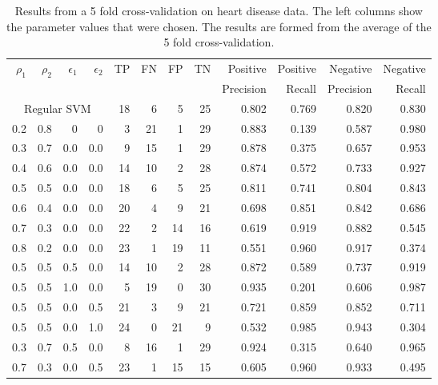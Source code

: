           

\begin{table}[htbp]\label{table:HeartDisease1}
  \centering
    \begin{tabular}{rrrr|rrrrrrrr}
    \hline
    \multirow{2}{*}{$\rho_1$} & \multirow{2}{*}{$\rho_2$} & \multirow{2}{*}{$\epsilon_1$} & \multirow{2}{*}{$\epsilon_2$} & \multirow{2}{*}{TP}    & \multirow{2}{*}{FN}    & \multirow{2}{*}{FP}    & \multirow{2}{*}{TN} & Positive & Positive & Negative & Negative\\
    &&&&&&&&  Precision &  Recall &  Precision &  Recall \bigstrut\\
    \hline
    \hline
   \multicolumn{4}{c|}{Regular SVM} & 18    & 6     & 5     & 25    & 0.802 & 0.769 & 0.820 & 0.830 \bigstrut[t]\\
    0.2   & 0.8   & 0     & 0     & 3     & 21    & 1     & 29    & 0.883 & 0.139 & 0.587 & 0.980 \bigstrut[t]\\
    0.3   & 0.7   & 0.0   & 0.0   & 9     & 15    & 1     & 29    & 0.878 & 0.375 & 0.657 & 0.953 \\
    0.4   & 0.6   & 0.0   & 0.0   & 14    & 10    & 2     & 28    & 0.874 & 0.572 & 0.733 & 0.927 \\
    0.5   & 0.5   & 0.0   & 0.0   & 18    & 6     & 5     & 25    & 0.811 & 0.741 & 0.804 & 0.843 \\
    0.6   & 0.4   & 0.0   & 0.0   & 20    & 4     & 9     & 21    & 0.698 & 0.851 & 0.842 & 0.686 \\
    0.7   & 0.3   & 0.0   & 0.0   & 22    & 2     & 14    & 16    & 0.619 & 0.919 & 0.882 & 0.545 \\
    0.8   & 0.2   & 0.0   & 0.0   & 23    & 1     & 19    & 11    & 0.551 & 0.960 & 0.917 & 0.374 \\
    0.5   & 0.5   & 0.5   & 0.0   & 14    & 10    & 2     & 28    & 0.872 & 0.589 & 0.737 & 0.919 \\
    0.5   & 0.5   & 1.0   & 0.0   & 5     & 19    & 0     & 30    & 0.935 & 0.201 & 0.606 & 0.987 \\
    0.5   & 0.5   & 0.0   & 0.5   & 21    & 3     & 9     & 21    & 0.721 & 0.859 & 0.852 & 0.711 \\
    0.5   & 0.5   & 0.0   & 1.0   & 24    & 0     & 21    & 9     & 0.532 & 0.985 & 0.943 & 0.304 \\
    0.3   & 0.7   & 0.5   & 0.0   & 8     & 16    & 1     & 29    & 0.924 & 0.315 & 0.640 & 0.965 \\
    0.7   & 0.3   & 0.0   & 0.5   & 23    & 1     & 15    & 15    & 0.605 & 0.960 & 0.933 & 0.495 \bigstrut[b]\\
    \hline
    \hline
    \end{tabular}%
    \caption{Results from a 5 fold cross-validation on heart disease data. The left columns show the parameter values that were chosen. The results are formed from the average of the 5 fold cross-validation.}
\end{table}%


